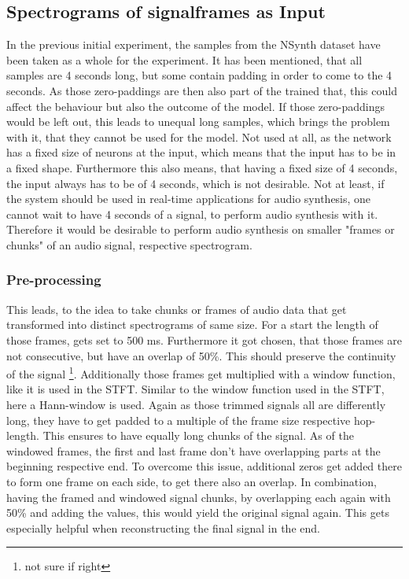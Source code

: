 \subsection{Spectrograms of signalframes as Input}
In the previous initial experiment, the samples from the NSynth dataset have been taken as a whole for the experiment. It has been mentioned, that all samples are 4 seconds long, but some contain padding in order to come to the 4 seconds. As those zero-paddings are then also part of the trained that, this could affect the behaviour but also the outcome of the model. If those zero-paddings would be left out, this leads to unequal long samples, which brings the problem with it, that they cannot be used for the model. Not used at all, as the network has a fixed size of neurons at the input, which means that the input has to be in a fixed shape. Furthermore this also means, that having a fixed size of 4 seconds, the input always has to be of 4 seconds, which is not desirable. Not at least, if the system should be used in real-time applications for audio synthesis, one cannot wait to have 4 seconds of a signal, to perform audio synthesis with it. Therefore it would be desirable to perform audio synthesis on smaller "frames or chunks" of an audio signal, respective spectrogram. 

\subsubsection{Pre-processing}
This leads, to the idea to take chunks or frames of audio data that get transformed into distinct spectrograms of same size. For a start the length of those frames, gets set to 500 ms. Furthermore it got chosen, that those frames are not consecutive, but have an overlap of 50\%. This should preserve the continuity of the signal \footnote{not sure if right}. Additionally those frames get multiplied with a window function, like it is used in the STFT. Similar to the window function used in the STFT, here a Hann-window is used.  Again as those trimmed signals all are differently long, they have to get padded to a multiple of the frame size respective hop-length. This ensures to have equally long chunks of the signal. As of the windowed frames, the first and last frame don't have overlapping parts at the beginning respective end. To overcome this issue, additional zeros get added there to form one frame on each side, to get there also an overlap. In combination, having the framed and windowed signal chunks, by overlapping each again with 50\% and adding the values, this would yield the original signal again. This gets especially helpful when reconstructing the final signal in the end. 

